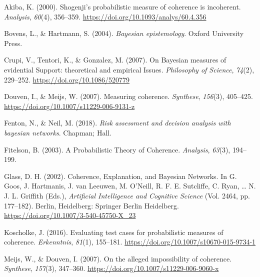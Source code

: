 \documentclass[
  10pt,
]{scrartcl}
\newlength{\cslhangindent}
\newlength{\cslentryspacingunit} %
\newenvironment{CSLReferences}[2] %
 {%
  \setlength{\parindent}{0pt}
  \ifodd #1
  \let\oldpar\par
  \def\par{\hangindent=\cslhangindent\oldpar}
  \fi
  \setlength{\parskip}{#2\cslentryspacingunit}
 }%
 {}
\begin{document}
\hypertarget{refs}{}
\begin{CSLReferences}{1}{0}
\leavevmode{}%
Akiba, K. (2000). Shogenji's probabilistic measure of coherence is incoherent. \emph{Analysis}, \emph{60}(4), 356--359. \url{https://doi.org/10.1093/analys/60.4.356}

\leavevmode{}%
Bovens, L., \& Hartmann, S. (2004). \emph{Bayesian epistemology}. Oxford University Press.

\leavevmode{}%
Crupi, V., Tentori, K., \& Gonzalez, M. (2007). On {Bayesian measures} of {evidential Support}: {theoretical} and {empirical Issues}. \emph{Philosophy of Science}, \emph{74}(2), 229--252. \url{https://doi.org/10.1086/520779}

\leavevmode{}%
Douven, I., \& Meijs, W. (2007). Measuring coherence. \emph{Synthese}, \emph{156}(3), 405--425. \url{https://doi.org/10.1007/s11229-006-9131-z}

\leavevmode{}%
Fenton, N., \& Neil, M. (2018). \emph{Risk assessment and decision analysis with bayesian networks}. Chapman; Hall.

\leavevmode{}%
Fitelson, B. (2003). A {Probabilistic Theory} of {Coherence}. \emph{Analysis}, \emph{63}(3), 194--199.

\leavevmode{}%
Glass, D. H. (2002). Coherence, {Explanation}, and {Bayesian Networks}. In G. Goos, J. Hartmanis, J. van Leeuwen, M. O'Neill, R. F. E. Sutcliffe, C. Ryan, \ldots{} N. J. L. Griffith (Eds.), \emph{Artificial {Intelligence} and {Cognitive Science}} (Vol. 2464, pp. 177--182). {Berlin, Heidelberg}: {Springer Berlin Heidelberg}. \url{https://doi.org/10.1007/3-540-45750-X_23}

\leavevmode{}%
Koscholke, J. (2016). Evaluating test cases for probabilistic measures of coherence. \emph{Erkenntnis}, \emph{81}(1), 155--181. \url{https://doi.org/10.1007/s10670-015-9734-1}

\leavevmode{}%
Meijs, W., \& Douven, I. (2007). On the alleged impossibility of coherence. \emph{Synthese}, \emph{157}(3), 347--360. \url{https://doi.org/10.1007/s11229-006-9060-x}


\end{CSLReferences}
\end{document}
